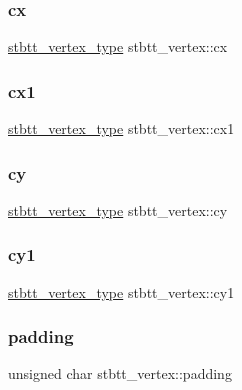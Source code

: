 \subsubsection{\texorpdfstring{cx}{cx}}
{\footnotesize\ttfamily \mbox{\hyperlink{stb__truetype_8h_ab8fd8e5e0b82b0f7da54532035e47b22}{stbtt\+\_\+vertex\+\_\+type}} stbtt\+\_\+vertex\+::cx}

\mbox{\label{structstbtt__vertex_a1c45a8d41727b24b84f97a944f2b800a}} 
\subsubsection{\texorpdfstring{cx1}{cx1}}
{\footnotesize\ttfamily \mbox{\hyperlink{stb__truetype_8h_ab8fd8e5e0b82b0f7da54532035e47b22}{stbtt\+\_\+vertex\+\_\+type}} stbtt\+\_\+vertex\+::cx1}

\mbox{\label{structstbtt__vertex_a5610d6335aa6962d970fc7fd2225545e}} 
\subsubsection{\texorpdfstring{cy}{cy}}
{\footnotesize\ttfamily \mbox{\hyperlink{stb__truetype_8h_ab8fd8e5e0b82b0f7da54532035e47b22}{stbtt\+\_\+vertex\+\_\+type}} stbtt\+\_\+vertex\+::cy}

\mbox{\label{structstbtt__vertex_a68227d28643f5667064fa3c385f4ea7d}} 
\subsubsection{\texorpdfstring{cy1}{cy1}}
{\footnotesize\ttfamily \mbox{\hyperlink{stb__truetype_8h_ab8fd8e5e0b82b0f7da54532035e47b22}{stbtt\+\_\+vertex\+\_\+type}} stbtt\+\_\+vertex\+::cy1}

\mbox{\label{structstbtt__vertex_a8bd328747e8ea018612960a52e3e3ede}} 
\subsubsection{\texorpdfstring{padding}{padding}}
{\footnotesize\ttfamily unsigned char stbtt\+\_\+vertex\+::padding}

